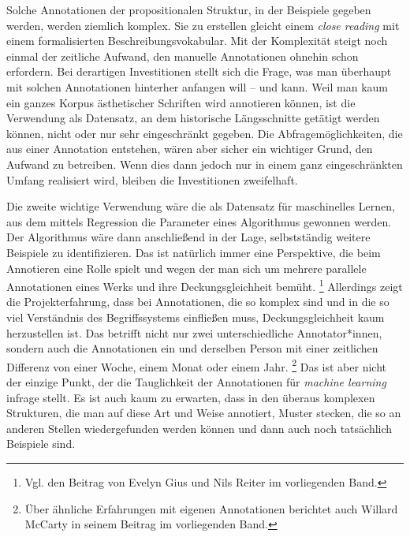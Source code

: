 \documentclass{article}
\newcommand*{\englisch}[1]{\foreignlanguage{english}{\textit{#1}}}%
\begin{document}
Solche Annotationen der propositionalen Struktur, in der Beispiele
gegeben werden, werden ziemlich komplex. Sie zu erstellen gleicht
einem \englisch{close reading} mit einem formalisierten
Beschreibungsvokabular. Mit der Komplexität steigt noch einmal der
zeitliche Aufwand, den manuelle Annotationen ohnehin schon
erfordern. Bei derartigen Investitionen stellt sich die Frage, was man
überhaupt mit solchen Annotationen hinterher anfangen will -- und
kann. Weil man kaum ein ganzes Korpus ästhetischer Schriften wird
annotieren können, ist die Verwendung als Datensatz, an dem
historische Längsschnitte getätigt werden können, nicht oder nur sehr
eingeschränkt gegeben. Die Abfragemöglichkeiten, die aus einer
Annotation entstehen, wären aber sicher ein wichtiger Grund, den
Aufwand zu betreiben. Wenn dies dann jedoch nur in einem ganz
eingeschränkten Umfang realisiert wird, bleiben die Investitionen
zweifelhaft.

Die zweite wichtige Verwendung wäre die als Datensatz für maschinelles
Lernen, aus dem mittels Regression die Parameter eines Algorithmus
gewonnen werden. Der Algorithmus wäre dann anschließend in der Lage,
selbstständig weitere Beispiele zu identifizieren. Das ist natürlich
immer eine Perspektive, die beim Annotieren eine Rolle spielt und
wegen der man sich um mehrere parallele Annotationen eines Werks und
ihre Deckungsgleichheit bemüht.%
\footnote{Vgl. den Beitrag von Evelyn Gius und Nils Reiter im
  vorliegenden Band.} %
Allerdings zeigt die Projekterfahrung, dass bei Annotationen, die so
komplex sind und in die so viel Verständnis des Begriffssystems
einfließen muss, Deckungsgleichheit kaum herzustellen ist. Das
betrifft nicht nur zwei unterschiedliche Annotator*innen, sondern auch
die Annotationen ein und derselben Person mit einer zeitlichen
Differenz von einer Woche, einem Monat oder einem Jahr.%
\footnote{Über ähnliche Erfahrungen mit eigenen Annotationen berichtet
  auch Willard McCarty in seinem Beitrag im vorliegenden Band.} %
Das ist aber nicht der einzige Punkt, der die Tauglichkeit der
Annotationen für \englisch{machine learning} infrage stellt. Es ist
auch kaum zu erwarten, dass in den überaus komplexen Strukturen, die
man auf diese Art und Weise annotiert, Muster stecken, die so an
anderen Stellen wiedergefunden werden können und dann auch noch
tatsächlich Beispiele sind.
\end{document}
